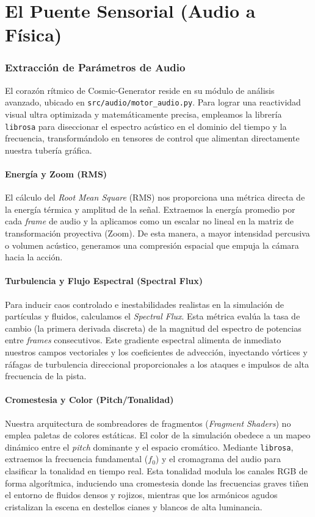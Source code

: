 \documentclass[12pt, openany]{book}
\begin{document}
\part{El Puente Sensorial (Audio a Física)}

\section{Extracción de Parámetros de Audio}
\label{sec:extraccion_audio}

El corazón rítmico de Cosmic-Generator reside en su módulo de análisis avanzado, ubicado en \texttt{src/audio/motor\_audio.py}. Para lograr una reactividad visual ultra optimizada y matemáticamente precisa, empleamos la librería \texttt{librosa} para diseccionar el espectro acústico en el dominio del tiempo y la frecuencia, transformándolo en tensores de control que alimentan directamente nuestra tubería gráfica.

\subsection{Energía y Zoom (RMS)}
El cálculo del \textit{Root Mean Square} (RMS) nos proporciona una métrica directa de la energía térmica y amplitud de la señal.
Extraemos la energía promedio por cada \textit{frame} de audio y la aplicamos como un escalar no lineal en la matriz de transformación proyectiva (Zoom). De esta manera, a mayor intensidad percusiva o volumen acústico, generamos una compresión espacial que empuja la cámara hacia la acción.

\subsection{Turbulencia y Flujo Espectral (Spectral Flux)}
Para inducir caos controlado e inestabilidades realistas en la simulación de partículas y fluidos, calculamos el \textit{Spectral Flux}. Esta métrica evalúa la tasa de cambio (la primera derivada discreta) de la magnitud del espectro de potencias entre \textit{frames} consecutivos.
Este gradiente espectral alimenta de inmediato nuestros campos vectoriales y los coeficientes de advección, inyectando vórtices y ráfagas de turbulencia direccional proporcionales a los ataques e impulsos de alta frecuencia de la pista.

\subsection{Cromestesia y Color (Pitch/Tonalidad)}
Nuestra arquitectura de sombreadores de fragmentos (\textit{Fragment Shaders}) no emplea paletas de colores estáticas. El color de la simulación obedece a un mapeo dinámico entre el \textit{pitch} dominante y el espacio cromático.
Mediante \texttt{librosa}, extraemos la frecuencia fundamental ($f_0$) y el cromagrama del audio para clasificar la tonalidad en tiempo real. Esta tonalidad modula los canales RGB de forma algorítmica, induciendo una cromestesia donde las frecuencias graves tiñen el entorno de fluidos densos y rojizos, mientras que los armónicos agudos cristalizan la escena en destellos cianes y blancos de alta luminancia.
\end{document}
